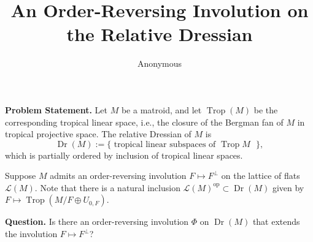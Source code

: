 \documentclass[12pt]{article}
\title{An Order-Reversing Involution on the Relative Dressian}
\author{Anonymous}
\date{}
\DeclareMathOperator{\Trop}{Trop}
\DeclareMathOperator{\Dr}{Dr}
\newcommand{\cLL}{\mathcal{L}}
\newcommand{\op}{\mathrm{op}}
\begin{document}
\maketitle

\noindent \textbf{Problem Statement.} Let $M$ be a matroid, and let $\Trop(M)$ be the corresponding tropical linear space, i.e., the closure of the Bergman fan of $M$ in tropical projective space. The relative Dressian of $M$ is 
\[ \Dr(M) :=\{\text{ tropical linear subspaces of $\Trop M$ }\}, \]
which is partially ordered by inclusion of tropical linear spaces. 

Suppose $M$ admits an order-reversing involution $F\mapsto F^\perp$ on the lattice of flats $\cLL(M)$. Note that there is a natural inclusion $\cLL(M)^{\op} \subset \Dr(M)$ given by $F\mapsto \Trop(M/F\oplus U_{0,F})$.

\medskip
\noindent \textbf{Question.} Is there an order-reversing involution $\Phi$ on $\Dr(M)$ that extends the involution $F\mapsto F^\perp$?

\bigskip
\end{document}
